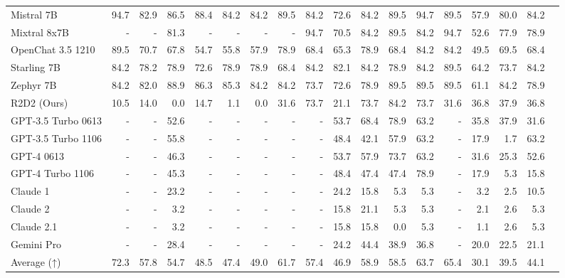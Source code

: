 \begin{table}
\begin{tabular}{l|rrrrrrrrrrrrrrrrr}
Mistral 7B &94.7 &82.9 &86.5 &88.4 &84.2 &84.2 &89.5 &84.2 &72.6 &84.2 &89.5 &94.7 &89.5 &57.9 &80.0 &84.2 \\
Mixtral 8x7B &- &- &81.3 &- &- &- &- &94.7 &70.5 &84.2 &89.5 &84.2 &94.7 &52.6 &77.9 &78.9 \\
OpenChat 3.5 1210 &89.5 &70.7 &67.8 &54.7 &55.8 &57.9 &78.9 &68.4 &65.3 &78.9 &68.4 &84.2 &84.2 &49.5 &69.5 &68.4 \\
Starling 7B &84.2 &78.2 &78.9 &72.6 &78.9 &78.9 &68.4 &84.2 &82.1 &84.2 &78.9 &84.2 &89.5 &64.2 &73.7 &84.2 \\
Zephyr 7B &84.2 &82.0 &88.9 &86.3 &85.3 &84.2 &84.2 &73.7 &72.6 &78.9 &89.5 &89.5 &89.5 &61.1 &84.2 &78.9 \\
R2D2 (Ours) &10.5 &14.0 &0.0 &14.7 &1.1 &0.0 &31.6 &73.7 &21.1 &73.7 &84.2 &73.7 &31.6 &36.8 &37.9 &36.8 \\ \midrule
GPT-3.5 Turbo 0613 &- &- &52.6 &- &- &- &- &- &53.7 &68.4 &78.9 &63.2 &- &35.8 &37.9 &31.6 \\
GPT-3.5 Turbo 1106 &- &- &55.8 &- &- &- &- &- &48.4 &42.1 &57.9 &63.2 &- &17.9 &1.7 &63.2 \\
GPT-4 0613 &- &- &46.3 &- &- &- &- &- &53.7 &57.9 &73.7 &63.2 &- &31.6 &25.3 &52.6 \\
GPT-4 Turbo 1106 &- &- &45.3 &- &- &- &- &- &48.4 &47.4 &47.4 &78.9 &- &17.9 &5.3 &15.8 \\
Claude 1 &- &- &23.2 &- &- &- &- &- &24.2 &15.8 &5.3 &5.3 &- &3.2 &2.5 &10.5 \\
Claude 2 &- &- &3.2 &- &- &- &- &- &15.8 &21.1 &5.3 &5.3 &- &2.1 &2.6 &5.3 \\
Claude 2.1 &- &- &3.2 &- &- &- &- &- &15.8 &15.8 &0.0 &5.3 &- &1.1 &2.6 &5.3 \\
Gemini Pro &- &- &28.4 &- &- &- &- &- &24.2 &44.4 &38.9 &36.8 &- &20.0 &22.5 &21.1 \\
Average (↑) &72.3 &57.8 &54.7 &48.5 &47.4 &49.0 &61.7 &57.4 &46.9 &58.9 &58.5 &63.7 &65.4 &30.1 &39.5 &44.1 \\
\bottomrule
\end{tabular}
\end{table}

